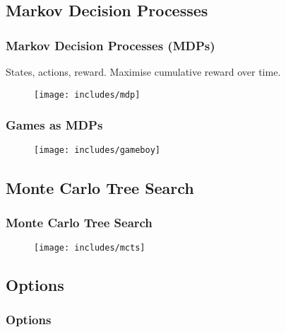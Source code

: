 \documentclass[aspectratio=169]{beamer}
\begin{document}
\subsection{Markov Decision Processes}
\begin{frame}
	\frametitle{Markov Decision Processes (MDPs) \cite{sutton1998reinforcement}}
	States, actions, reward. Maximise cumulative reward over time.
	\begin{figure}
	\centering
	\texttt{[image: includes/mdp]}
	\end{figure}
\end{frame}
\begin{frame}
	\frametitle{Games as MDPs}
	\begin{figure}
	\centering
	\texttt{[image: includes/gameboy]}
	\end{figure}
\end{frame}

\subsection{Monte Carlo Tree Search}
\begin{frame}
	\frametitle{Monte Carlo Tree Search\cite{gelly2006modification}}
	\begin{figure}
	\centering
	\texttt{[image: includes/mcts]}
	\end{figure}
\end{frame}

\subsection{Options}
\begin{frame}
	\frametitle{Options \cite{sutton1999between, barto2003recent}}
\end{frame}
\end{document}
